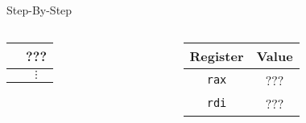 \documentclass[hyphens,aspectratio=169]{beamer}
\begin{document}
\begin{frame}[fragile]{Step-By-Step}
\begin{columns}
\begin{column}{0.33\textwidth}
{\begin{tabular}{c|c|}
                \hline
                & ??? \\
                \hline
                & $\vdots$
            \end{tabular}}
        \end{column}
        \begin{column}{0.33\textwidth}
            \begin{tabular}{| c | c |}
                \hline
                Register & Value \\
                \hline
                \texttt{rax} & ??? \\
                \hline
                \texttt{rdi} & ??? \\
                \hline
            \end{tabular}
        \end{column}
    \end{columns}
\end{frame}
\end{document}

